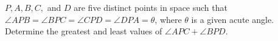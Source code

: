 $P, A, B, C,$ and $D$ are five distinct points in space such that $\angle APB = \angle BPC = \angle CPD = \angle DPA = \theta$,  where $\theta$ is a given acute angle. Determine the greatest and least values of $\angle APC + \angle BPD$.